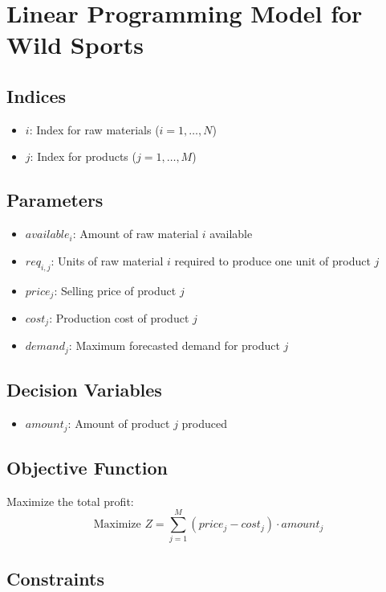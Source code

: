 \documentclass{article}
\begin{document}
\section*{Linear Programming Model for Wild Sports}

\subsection*{Indices}
\begin{itemize}
    \item $i$: Index for raw materials ($i = 1, \ldots, N$)
    \item $j$: Index for products ($j = 1, \ldots, M$)
\end{itemize}

\subsection*{Parameters}
\begin{itemize}
    \item $available_i$: Amount of raw material $i$ available
    \item $req_{i,j}$: Units of raw material $i$ required to produce one unit of product $j$
    \item $price_j$: Selling price of product $j$
    \item $cost_j$: Production cost of product $j$
    \item $demand_j$: Maximum forecasted demand for product $j$
\end{itemize}

\subsection*{Decision Variables}
\begin{itemize}
    \item $amount_j$: Amount of product $j$ produced
\end{itemize}

\subsection*{Objective Function}
Maximize the total profit:
\[
\text{Maximize } Z = \sum_{j=1}^{M} (price_j - cost_j) \cdot amount_j
\]

\subsection*{Constraints}
\]
\end{document}
